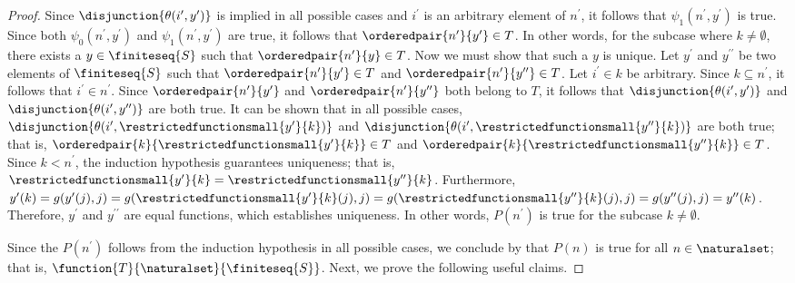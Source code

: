 \begin{proof}
    \vspace{0.3cm}
    \noindent
    Since \( \disjunction{\theta(i^{\prime}, y^{\prime})} \) is implied in all possible cases and \( i^{\prime} \) is an arbitrary element of \( n^{\prime} \),
    it follows that \( \psi_{1}(n^{\prime}, y^{\prime}) \) is true. Since both \( \psi_{0}(n^{\prime}, y^{\prime}) \) and \( \psi_{1}(n^{\prime}, y^{\prime}) \)
    are true, it follows that \( \orderedpair{n^{\prime}}{y^{\prime}} \in T \).
    In other words, for the subcase where \( k \neq \emptyset \), there exists a \( y \in \finiteseq{S} \) such that \( \orderedpair{n^{\prime}}{y} \in T \).
    Now we must show that such a \( y \) is unique.
    Let \( y^{\prime} \) and \( y^{\prime\prime} \) be two elements of \( \finiteseq{S} \) such that \( \orderedpair{n^{\prime}}{y^{\prime}} \in T \)
    and \( \orderedpair{n^{\prime}}{y^{\prime\prime}} \in T \).
    Let \( i^{\prime} \in k \) be arbitrary.
    Since \( k \subseteq n^{\prime} \), it follows that \( i^{\prime} \in n^{\prime} \).
    Since \( \orderedpair{n^{\prime}}{y^{\prime}} \) and \( \orderedpair{n^{\prime}}{y^{\prime\prime}} \) both belong to \( T \), it follows that
    \( \disjunction{\theta(i^{\prime}, y^{\prime})} \) and \( \disjunction{\theta(i^{\prime}, y^{\prime\prime})} \) are both true.
    It can be shown that in all possible cases, \( \disjunction{\theta(i^{\prime}, \restrictedfunctionsmall{y^{\prime}}{k} )} \)
    and \( \disjunction{\theta(i^{\prime}, \restrictedfunctionsmall{y^{\prime\prime}}{k})} \) are both true;
    that is, \( \orderedpair{k}{ \restrictedfunctionsmall{y^{\prime}}{k} } \in T \) and \( \orderedpair{k}{ \restrictedfunctionsmall{y^{\prime\prime}}{k} } \in T \).
    Since \( k < n^{\prime} \), the induction hypothesis guarantees uniqueness;
    that is, \( \restrictedfunctionsmall{y^{\prime}}{k} = \restrictedfunctionsmall{y^{\prime\prime}}{k} \).
    Furthermore, \( y^{\prime}(k) = g(y^{\prime}(j), j) = g( \restrictedfunctionsmall{y^{\prime}}{k}(j), j) = g( \restrictedfunctionsmall{y^{\prime\prime}}{k}(j), j )
    = g( y^{\prime\prime}(j), j ) = y^{\prime\prime}(k) \).
    Therefore, \( y^{\prime} \) and \( y^{\prime\prime} \) are equal functions, which establishes uniqueness.
    In other words, \( P(n^{\prime}) \) is true for the subcase \( k \neq \emptyset \).

    \vspace{0.3cm}
    \noindent
    Since the \( P(n^{\prime}) \) follows from the induction hypothesis in all possible cases, we conclude by 
    that \( P(n) \) is true for all \( n \in \naturalset \); that is, \( \function{T}{\naturalset}{\finiteseq{S}} \).
    Next, we prove the following useful claims.


\end{proof}
